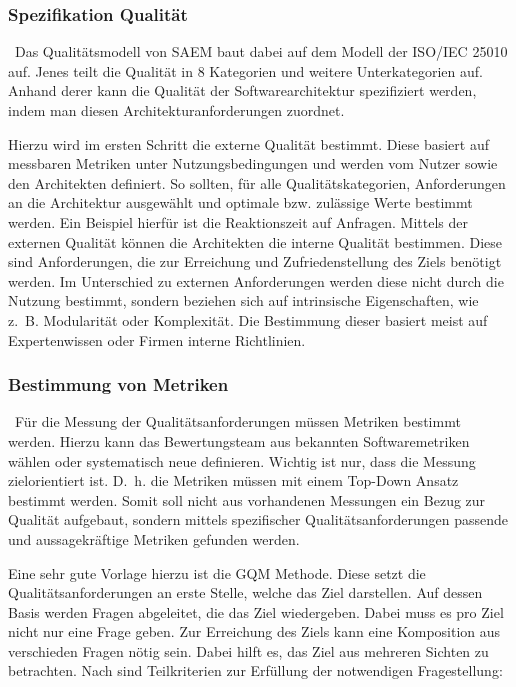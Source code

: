 \subsubsection{Spezifikation Qualität}
\
Das Qualitätsmodell von \ac{SAEM} baut dabei auf dem Modell der ISO/IEC 25010 auf. Jenes teilt die Qualität in 8 Kategorien und weitere Unterkategorien auf\cite{ISOIEC25010}. Anhand derer kann die Qualität der Softwarearchitektur spezifiziert werden, indem man diesen Architekturanforderungen zuordnet.


Hierzu wird im ersten Schritt die externe Qualität bestimmt. Diese basiert auf messbaren Metriken unter Nutzungsbedingungen und werden vom Nutzer sowie den Architekten definiert\cite{Duenas1998}. So sollten, für alle Qualitätskategorien, Anforderungen an die Architektur ausgewählt und optimale bzw. zulässige Werte bestimmt werden. Ein Beispiel hierfür ist die Reaktionszeit auf Anfragen. 
Mittels der externen Qualität können die Architekten die interne Qualität bestimmen. Diese sind Anforderungen, die zur Erreichung und Zufriedenstellung des Ziels benötigt werden. Im Unterschied zu externen Anforderungen werden diese nicht durch die Nutzung bestimmt, sondern beziehen sich auf intrinsische Eigenschaften, wie z.~B. Modularität oder Komplexität\cite{Duenas1998}. Die Bestimmung dieser basiert meist auf Expertenwissen oder Firmen interne Richtlinien.

\subsubsection{Bestimmung von Metriken}
\
Für die Messung der Qualitätsanforderungen müssen Metriken bestimmt werden. Hierzu kann das Bewertungsteam aus bekannten Softwaremetriken wählen oder systematisch neue definieren. Wichtig ist nur, dass die Messung zielorientiert ist. D. h. die Metriken müssen mit einem Top-Down Ansatz bestimmt werden\cite{Habenicht2008}. Somit soll nicht aus vorhandenen Messungen ein Bezug zur Qualität aufgebaut, sondern mittels spezifischer Qualitätsanforderungen passende und aussagekräftige Metriken gefunden werden.

Eine sehr gute Vorlage hierzu ist die \ac{GQM} Methode. Diese setzt die Qualitätsanforderungen an erste Stelle, welche das Ziel darstellen. Auf dessen Basis werden Fragen abgeleitet, die das Ziel wiedergeben. Dabei muss es pro Ziel nicht nur eine Frage geben. Zur Erreichung des Ziels kann eine Komposition aus verschieden Fragen nötig sein. Dabei hilft es, das Ziel aus mehreren Sichten zu betrachten. Nach\cite{Habenicht2008}
sind Teilkriterien zur Erfüllung der notwendigen Fragestellung:
 
